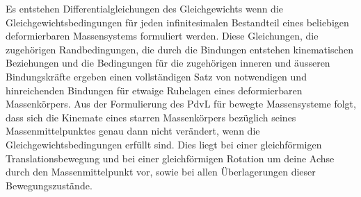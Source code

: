 \newline\newline
Es entstehen Differentialgleichungen des Gleichgewichts wenn die Gleichgewichtsbedingungen für jeden infinitesimalen Bestandteil eines beliebigen deformierbaren Massensystems formuliert werden. Diese Gleichungen, die zugehörigen Randbedingungen, die durch die Bindungen entstehen kinematischen Beziehungen und die Bedingungen für die zugehörigen inneren und äusseren Bindungskräfte ergeben einen vollständigen Satz von notwendigen und hinreichenden Bindungen für etwaige Ruhelagen eines deformierbaren Massenkörpers.
\newline\newline
Aus der Formulierung des PdvL für bewegte Massensysteme folgt, dass sich die Kinemate eines starren Massenkörpers bezüglich seines Massenmittelpunktes genau dann nicht verändert, wenn die Gleichgewichtsbedingungen erfüllt sind. Dies liegt bei einer gleichförmigen Translationsbewegung und bei einer gleichförmigen Rotation um deine Achse durch den Massenmittelpunkt vor, sowie bei allen Überlagerungen dieser Bewegungszustände.   